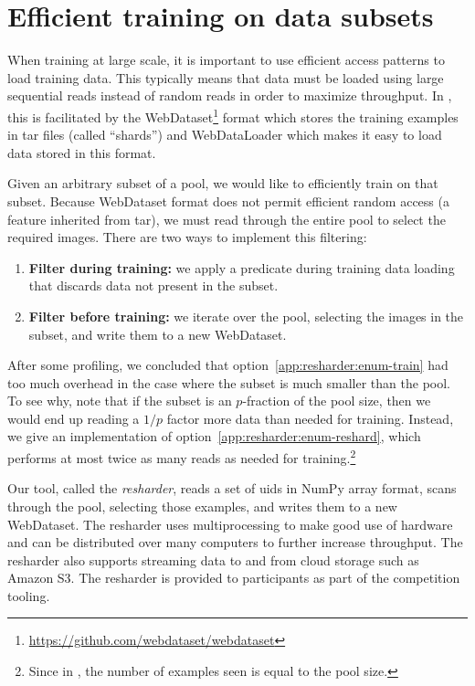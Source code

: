 \FloatBarrier



\section{Efficient training on data subsets}
\label{app:resharder}

When training at large scale, it is important to use efficient access patterns to load training data.
This typically means that data must be loaded using large sequential reads instead of random reads in order to maximize throughput.
In \datanet{}, this is facilitated by the WebDataset\footnote{\url{https://github.com/webdataset/webdataset}} format which stores the training examples in tar files (called ``shards'') and WebDataLoader which makes it easy to load data stored in this format.

Given an arbitrary subset of a pool, we would like to efficiently train on that subset.
Because WebDataset format does not permit efficient random access (a feature inherited from tar), we must read through the entire pool to select the required images.
There are two ways to implement this filtering:
\begin{enumerate}
    \item \textbf{Filter during training:} we apply a predicate during training data loading that discards data not present in the subset.\label{app:resharder:enum-train}
    \item  \textbf{Filter before training:} we iterate over the pool, selecting the images in the subset, and write them to a new WebDataset.\label{app:resharder:enum-reshard}
\end{enumerate}
After some profiling, we concluded that option~\ref{app:resharder:enum-train} had too much overhead in the case where the subset is much smaller than the pool. To see why, note that if the subset is an \(p\)-fraction of the pool size, then we would end up reading a \(1/p\) factor more data than needed for training.
Instead, we give an implementation of option~\ref{app:resharder:enum-reshard}, which performs at most twice as many reads as needed for training.\footnote{Since in \datanet{}, the number of examples seen is equal to the pool size.}

Our tool, called the \textit{resharder}, reads a set of uids in NumPy array format, scans through the pool, selecting those examples, and writes them to a new WebDataset.
The resharder uses multiprocessing to make good use of hardware and can be distributed over many computers to further increase throughput.
The resharder also supports streaming data to and from cloud storage such as Amazon S3.
The resharder is provided to participants as part of the competition tooling.

